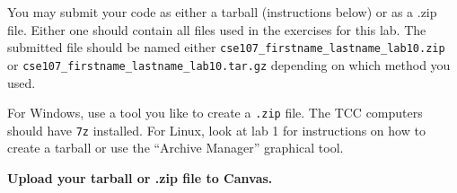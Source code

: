 \documentclass[11pt]{cselabheader}
\begin{document}
You may submit your code as either a tarball (instructions below) or as a .zip
file. Either one should contain all files used in the exercises for this lab.
The submitted file should be named either
\texttt{cse107\_firstname\_lastname\_lab10.zip} or
\texttt{cse107\_firstname\_lastname\_lab10.tar.gz} depending on which method you
used.

For Windows, use a tool you like to create a \texttt{.zip} file. The TCC
computers should have \texttt{7z} installed. For Linux, look at lab 1 for
instructions on how to create a tarball or use the ``Archive Manager'' graphical
tool.

\begin{center}
  \textbf{Upload your tarball or .zip file to Canvas.}
\end{center}
\end{document}
